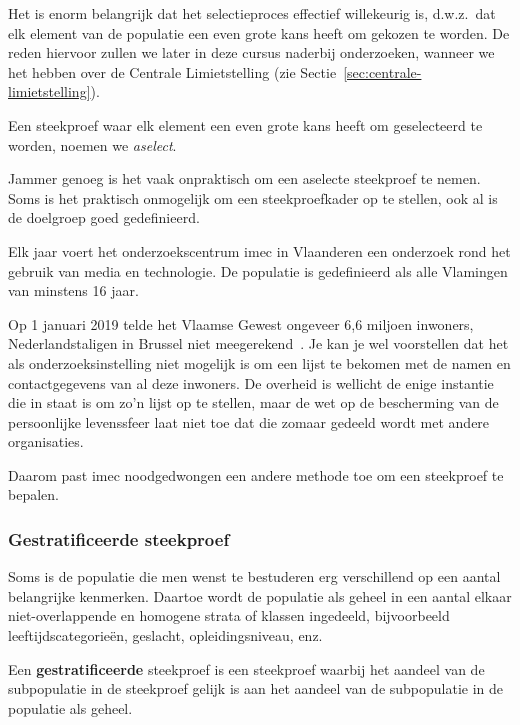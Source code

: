 Het is enorm belangrijk dat het selectieproces effectief willekeurig is, d.w.z.~dat elk element van de populatie een even grote kans heeft om gekozen te worden. De reden hiervoor zullen we later in deze cursus naderbij onderzoeken, wanneer we het hebben over de Centrale Limietstelling (zie Sectie~\ref{sec:centrale-limietstelling}).

\begin{definition}
  Een steekproef waar elk element een even grote kans heeft om geselecteerd te worden, noemen we \emph{aselect}.
\end{definition}

Jammer genoeg is het vaak onpraktisch om een aselecte steekproef te nemen. Soms is het praktisch onmogelijk om een steekproefkader op te stellen, ook al is de doelgroep goed gedefinieerd.

\begin{example}
  Elk jaar voert het onderzoekscentrum imec in Vlaanderen een onderzoek rond het gebruik van media en technologie. De populatie is gedefinieerd als alle Vlamingen van minstens 16 jaar.
  
  Op 1 januari 2019 telde het Vlaamse Gewest ongeveer 6,6 miljoen inwoners, Nederlandstaligen in Brussel niet meegerekend~\autocite{Statbel2019}. Je kan je wel voorstellen dat het als onderzoeksinstelling niet mogelijk is om een lijst te bekomen met de namen en contactgegevens van al deze inwoners. De overheid is wellicht de enige instantie die in staat is om zo'n lijst op te stellen, maar de wet op de bescherming van de persoonlijke levenssfeer laat niet toe dat die zomaar gedeeld wordt met andere organisaties.
  
  Daarom past imec noodgedwongen een andere methode toe om een steekproef te bepalen.
\end{example}

\subsubsection{Gestratificeerde steekproef}

Soms is de populatie die men wenst te bestuderen erg verschillend op een aantal belangrijke kenmerken. Daartoe wordt de populatie als geheel in een aantal elkaar niet-overlappende en homogene strata of klassen ingedeeld, bijvoorbeeld leeftijdscategorieën, geslacht, opleidingsniveau, enz.

\begin{definition}
  Een \textbf{gestratificeerde}  steekproef is een steekproef waarbij het aandeel van de subpopulatie in de steekproef gelijk is aan het aandeel van de subpopulatie in de populatie als geheel.
\end{definition}

